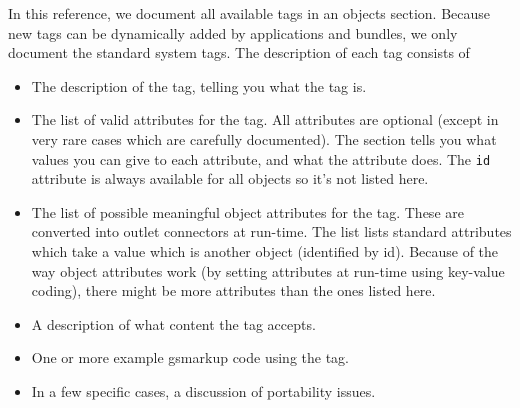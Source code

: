 In this reference, we document all available tags in an objects
section.  Because new tags can be dynamically added by applications
and bundles, we only document the standard system tags.  The
description of each tag consists of
\begin{itemize}
\item The description of the tag, telling you what the tag is.
\item The list of valid attributes for the tag.  All attributes are
  optional (except in very rare cases which are carefully documented).
  The section tells you what values you can give to each attribute,
  and what the attribute does.  The \texttt{id} attribute is always
  available for all objects so it's not listed here.
\item The list of possible meaningful object attributes for the tag.
  These are converted into outlet connectors at run-time.  The list
  lists standard attributes which take a value which is another object
  (identified by id).  Because of the way object attributes work (by
  setting attributes at run-time using key-value coding), there might
  be more attributes than the ones listed here.
\item A description of what content the tag accepts.
\item One or more example gsmarkup code using the tag.
\item In a few specific cases, a discussion of portability issues.
\end{itemize}

%
%

